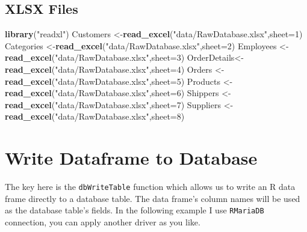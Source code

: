 \documentclass[
]{book}
\newenvironment{Shaded}{\begin{snugshade}}{\end{snugshade}}
\newcommand{\AttributeTok}[1]{\textcolor[rgb]{0.13,0.29,0.53}{#1}}
\newcommand{\DecValTok}[1]{\textcolor[rgb]{0.00,0.00,0.81}{#1}}
\newcommand{\FunctionTok}[1]{\textcolor[rgb]{0.13,0.29,0.53}{\textbf{#1}}}
\newcommand{\NormalTok}[1]{#1}
\newcommand{\OtherTok}[1]{\textcolor[rgb]{0.56,0.35,0.01}{#1}}
\newcommand{\StringTok}[1]{\textcolor[rgb]{0.31,0.60,0.02}{#1}}
\begin{document}
\hypertarget{xlsx-files}{%
\subsection{XLSX Files}\label{xlsx-files}}

\begin{Shaded}
\begin{Highlighting}[]
\FunctionTok{library}\NormalTok{(}\StringTok{"readxl"}\NormalTok{)                                  }
\NormalTok{Customers   }\OtherTok{\textless{}{-}}\FunctionTok{read\_excel}\NormalTok{(}\StringTok{"data/RawDatabase.xlsx"}\NormalTok{,}\AttributeTok{sheet=}\DecValTok{1}\NormalTok{)      }
\NormalTok{Categories  }\OtherTok{\textless{}{-}}\FunctionTok{read\_excel}\NormalTok{(}\StringTok{"data/RawDatabase.xlsx"}\NormalTok{,}\AttributeTok{sheet=}\DecValTok{2}\NormalTok{) }
\NormalTok{Employees   }\OtherTok{\textless{}{-}}\FunctionTok{read\_excel}\NormalTok{(}\StringTok{"data/RawDatabase.xlsx"}\NormalTok{,}\AttributeTok{sheet=}\DecValTok{3}\NormalTok{)}
\NormalTok{OrderDetails}\OtherTok{\textless{}{-}}\FunctionTok{read\_excel}\NormalTok{(}\StringTok{"data/RawDatabase.xlsx"}\NormalTok{,}\AttributeTok{sheet=}\DecValTok{4}\NormalTok{) }
\NormalTok{Orders      }\OtherTok{\textless{}{-}}\FunctionTok{read\_excel}\NormalTok{(}\StringTok{"data/RawDatabase.xlsx"}\NormalTok{,}\AttributeTok{sheet=}\DecValTok{5}\NormalTok{)}
\NormalTok{Products    }\OtherTok{\textless{}{-}}\FunctionTok{read\_excel}\NormalTok{(}\StringTok{"data/RawDatabase.xlsx"}\NormalTok{,}\AttributeTok{sheet=}\DecValTok{6}\NormalTok{) }
\NormalTok{Shippers    }\OtherTok{\textless{}{-}}\FunctionTok{read\_excel}\NormalTok{(}\StringTok{"data/RawDatabase.xlsx"}\NormalTok{,}\AttributeTok{sheet=}\DecValTok{7}\NormalTok{)  }
\NormalTok{Suppliers   }\OtherTok{\textless{}{-}}\FunctionTok{read\_excel}\NormalTok{(}\StringTok{"data/RawDatabase.xlsx"}\NormalTok{,}\AttributeTok{sheet=}\DecValTok{8}\NormalTok{)  }
\end{Highlighting}
\end{Shaded}

\hypertarget{write-dataframe-to-database}{%
\section{Write Dataframe to Database}\label{write-dataframe-to-database}}

The key here is the \texttt{dbWriteTable} function which allows us to write an R data frame directly to a database table. The data frame's column names will be used as the database table's fields. In the following example I use \texttt{RMariaDB} connection, you can apply another driver as you like.
\end{document}
